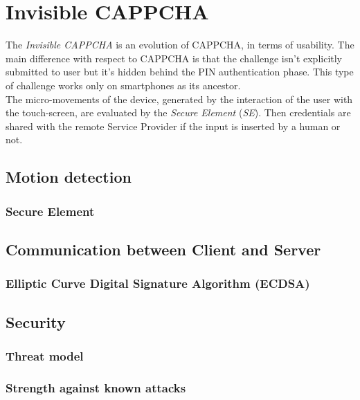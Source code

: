 \chapter{Invisible CAPPCHA}\label{chapter:InvisibleCAPPCHA}
The \textit{Invisible CAPPCHA} is an evolution of CAPPCHA, in terms of usability\cite{Invisible_CAPPCHA}. The main difference with respect to CAPPCHA is that the challenge isn't explicitly submitted to user but it's hidden behind the PIN authentication phase. This type of challenge works only on smartphones as its ancestor.\\
The micro-movements of the device, generated by the interaction of the user with the touch-screen, are evaluated by the \textit{Secure Element} (\textit{SE}). Then credentials are shared with the remote Service Provider if the input is inserted by a human or not.

\section{Motion detection}

\subsection{Secure Element}


\section{Communication between Client and Server}
\subsection{Elliptic Curve Digital Signature Algorithm (ECDSA)}


\section{Security}
\subsection{Threat model}
\subsection{Strength against known attacks}